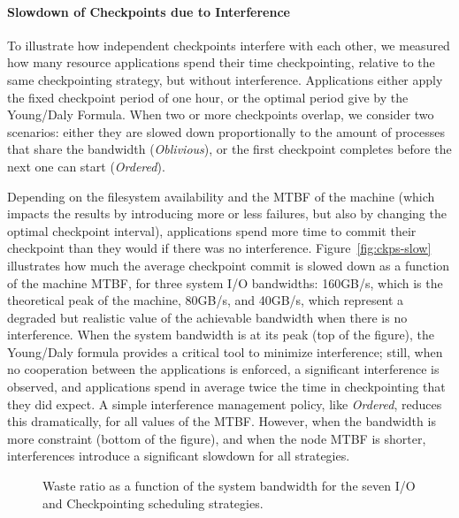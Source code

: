 \documentclass[conference,nofonttune]{IEEEtran}
\newcommand{\nocoop}{\emph{Oblivious}\xspace}
\newcommand{\fifoblock}{\emph{Ordered}\xspace}
\begin{document}
\paragraph{Slowdown of Checkpoints due to Interference}
To illustrate how independent checkpoints interfere with each other,
we measured how many resource applications spend their time
checkpointing, relative to the same checkpointing strategy, but
without interference. Applications either apply the fixed checkpoint
period of one hour, or the optimal period give by the Young/Daly
Formula. When two or more checkpoints overlap, we consider two
scenarios: either they are slowed down proportionally to the amount of
processes that share the bandwidth (\nocoop), or the first checkpoint
completes before the next one can start (\fifoblock).

Depending on the filesystem availability and the MTBF of the machine
(which impacts the results by introducing more or less failures, but
also by changing the optimal checkpoint interval), applications spend
more time to commit their checkpoint than they would if there was no
interference. Figure~\ref{fig:ckps-slow} illustrates how much
the average checkpoint commit is slowed down as a function of the
machine MTBF, for three system I/O bandwidths: 160GB/s, which is the
theoretical peak of the machine, 80GB/s, and 40GB/s, which represent a
degraded but realistic value of the achievable bandwidth when there is
no interference.  When the system bandwidth is at its peak
(top of the figure), the Young/Daly formula
provides a critical tool to minimize interference; still, when no
cooperation between the applications is enforced, a significant
interference is observed, and applications spend in average twice the
time in checkpointing that they did expect. A simple interference
management policy, like \fifoblock, reduces this dramatically, for all
values of the MTBF.  However, when the bandwidth is more constraint
(bottom of the figure), and when the node MTBF is
shorter, interferences introduce a significant slowdown for all
strategies. 

\begin{figure}
  \begin{center}
    \resizebox{1.05\linewidth}{!}{}
  \end{center}
  \caption{Waste ratio as a function of the system bandwidth for the
    seven I/O and Checkpointing scheduling strategies. \label{fig:cielo-1hmtbf}}
\end{figure}
\end{document}
